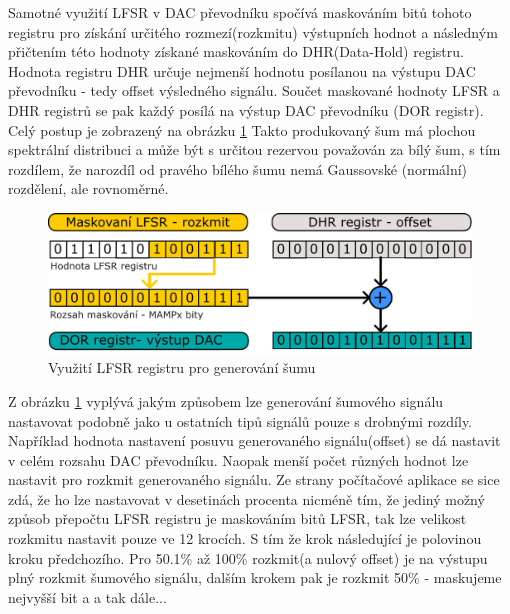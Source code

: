 Samotné využití LFSR v DAC převodníku spočívá  maskováním bitů tohoto registru pro získání určitého rozmezí(rozkmitu) výstupních hodnot a následným přičtením této hodnoty získané maskováním do DHR(Data-Hold) registru. Hodnota registru DHR určuje nejmenší hodnotu posílanou na výstupu DAC převodníku - tedy offset výsledného signálu. Součet maskované hodnoty LFSR a DHR registrů se pak každý  posílá na výstup DAC převodníku (DOR registr). Celý postup je zobrazený na obrázku \ref{fig:noiseGeneration} Takto produkovaný šum má plochou spektrální distribuci a může být s určitou rezervou považován za bílý šum, s tím rozdílem, že narozdíl od pravého bílého šumu nemá Gaussovské (normální) rozdělení, ale rovnoměrné.

\begin{figure}[H]
	\centering
	\includegraphics[width=0.7\linewidth]{Figs/Diagrams/SVG/NoiseGeneration.pdf}
	\caption{Využití LFSR registru pro generování šumu}
	\label{fig:noiseGeneration}
\end{figure}

Z obrázku \ref{fig:noiseGeneration} vyplývá jakým způsobem lze generování šumového signálu nastavovat podobně jako u ostatních tipů signálů pouze s drobnými rozdíly. Například hodnota nastavení posuvu generovaného signálu(offset) se dá nastavit v celém rozsahu DAC převodníku. Naopak menší počet různých hodnot lze nastavit pro rozkmit generovaného signálu.  Ze strany počítačové aplikace se sice zdá, že ho lze nastavovat v desetinách procenta nicméně tím, že jediný možný způsob přepočtu LFSR registru je maskováním bitů LFSR, tak lze velikost rozkmitu nastavit pouze ve 12 krocích. S tím že krok následující je polovinou kroku předchozího. Pro 50.1\% až 100\% rozkmit(a nulový offset) je na výstupu plný rozkmit šumového signálu, dalším krokem pak je rozkmit 50\% - maskujeme nejvyšší bit a a tak dále... 

